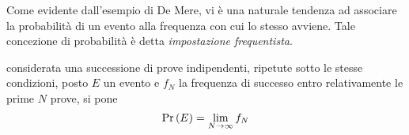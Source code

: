 \documentclass{subfiles}
\begin{document}
Come evidente dall'esempio di De Mere, vi è una naturale tendenza ad associare la probabilità di un evento alla frequenza con cui lo stesso avviene.
Tale concezione di probabilità è detta \emph{impostazione frequentista}.
\begin{Definition*}
    considerata una successione di prove indipendenti, ripetute sotto le stesse condizioni,
    posto \(E\) un evento e \(f_{N}\) la frequenza di successo entro relativamente le prime \(N\) prove, si pone
    \[
        \Prob{E} = \Lim{N}{\infty}{f_{N}}
    \]
\end{Definition*}
\end{document}
